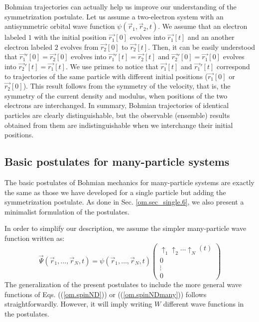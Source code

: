 \documentclass[onecolumn,nofootinbib, secnumarabic, amsmath, nobibnotes,11pt,aps,pra]{revtex4-1}
\newcommand{\pref}[1]{(\ref{#1})}
\newcommand{\sref}[1]{Sec. \ref{#1}}
\begin{document}
Bohmian trajectories can actually help us improve our understanding of the symmetrization postulate. Let us assume a two-electron system with an antisymmetric orbital wave function $\psi(\vec r_1,\vec r_2,t)$. We assume that an electron labeled $1$ with the initial position $\vec {r_1}[0]$ evolves into $\vec {r_1}[t]$ and an another electron labeled $2$ evolves from $\vec {r_2}[0]$ to $\vec {r_2}[t]$. Then, it can be easily understood that $\vec {r_1}'[0] = \vec {r_2}[0]$ evolves into $\vec {r_1}'[t] = \vec {r_2}[t]$ and $\vec {r_2}'[0] = \vec {r_1}[0]$ evolves into $\vec {r_2}'[t] = \vec {r_1}[t]$. We use primes to notice that $\vec {r_1}[t]$ and $\vec {r_1}'[t]$ correspond to trajectories of the same particle with different initial positions ($\vec {r_1}[0]$ or $\vec {r_2}[0]$).
This result follows from the symmetry of the velocity, that is, the symmetry of the current density and modulus, when positions of the two electrons are interchanged. In summary, Bohmian trajectories of identical particles are clearly distinguishable, but the observable (ensemble) results obtained from them are indistinguishable when we interchange their initial positions.

\subsection{Basic postulates  for many-particle systems}\label{om.sec_many.5}

The basic postulates of Bohmian mechanics for many-particle systems are exactly the same as those we have developed for a single particle but adding the symmetrization postulate. As done in \sref{om.sec_single.6}, we also present a minimalist formulation of the postulates.

\enlargethispage{-1pc}
In order to simplify our description, we assume the simpler many-particle wave function written as:
\begin{equation}
\label{om.wavepostulate}
\vec \Psi(\vec r_1,\ldots,\vec r_N,t) = \psi(\vec r_1,\ldots,\vec r_N,t)\left(
\begin{array}{c}
\uparrow_1 \uparrow_2\ldots\uparrow_N(t) \\ 0 \\ \vdots \\ 0
\end{array}
\right)
\end{equation}
The generalization of the present postulates to include the more general wave functions of Eqs. (\pref{om.spinND}) or (\pref{om.spinNDmany}) follows straightforwardly. However, it will imply writing $W$ different wave functions in the postulates.\\
\end{document}
